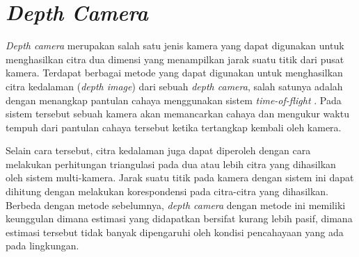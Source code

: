 \section{\emph{Depth Camera}}
\label{sec:depthcamera}

\emph{Depth camera} merupakan salah satu jenis kamera yang dapat digunakan untuk menghasilkan citra dua dimensi yang menampilkan jarak suatu titik dari pusat kamera.
Terdapat berbagai metode yang dapat digunakan untuk menghasilkan citra kedalaman (\emph{depth image}) dari sebuah \emph{depth camera},
  salah satunya adalah dengan menangkap pantulan cahaya menggunakan sistem \emph{time-of-flight} \citep{cit:idan2001}.
Pada sistem tersebut sebuah kamera akan memancarkan cahaya dan mengukur waktu tempuh dari pantulan cahaya tersebut ketika tertangkap kembali oleh kamera.

Selain cara tersebut,
  citra kedalaman juga dapat diperoleh dengan cara melakukan perhitungan triangulasi pada dua atau lebih citra yang dihasilkan oleh sistem multi-kamera.
Jarak suatu titik pada kamera dengan sistem ini dapat dihitung dengan melakukan korespondensi pada citra-citra yang dihasilkan.
Berbeda dengan metode sebelumnya,
  \emph{depth camera} dengan metode ini memiliki keunggulan dimana estimasi yang didapatkan bersifat kurang lebih pasif,
  dimana estimasi tersebut tidak banyak dipengaruhi oleh kondisi pencahayaan yang ada pada lingkungan.

